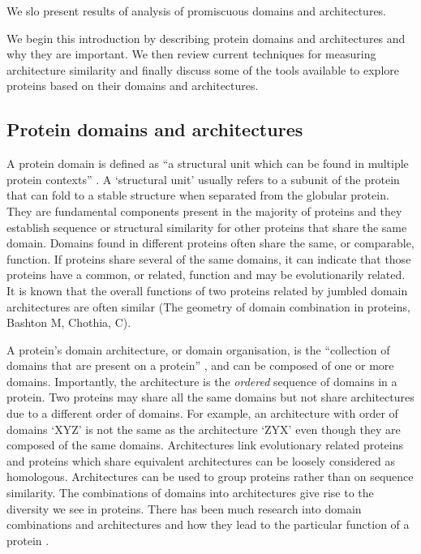 We slo present results of analysis of promiscuous domains and architectures.

We begin this introduction by describing protein domains and architectures and why they are important. We then review current techniques for measuring architecture similarity and finally discuss some of the tools available to explore proteins based on their domains and architectures.



\subsection{Protein domains and architectures}
A protein domain is defined as ``a structural unit which can be found in multiple protein contexts'' \cite{pfamdb}. A `structural unit' usually refers to a subunit of the protein that can fold to a stable structure when separated from the globular protein. They are fundamental components present in the majority of proteins and they establish sequence or structural similarity for other proteins that share the same domain. Domains found in different proteins often share the same, or comparable, function. If proteins share several of the same domains, it can indicate that those proteins have a common, or related, function and may be evolutionarily related. It is known that the overall functions of two proteins related by jumbled domain architectures are often similar (The geometry of domain combination in proteins, Bashton M, Chothia, C).

A protein's domain architecture, or domain organisation, is the ``collection of domains that are present on a protein'' \cite{pfamdb}, and can be composed of one or more domains. Importantly, the architecture is the \textit{ordered} sequence of domains in a protein. Two proteins may share all the same domains but not share architectures due to a different order of domains. For example, an architecture with order of domains `XYZ' is not the same as the architecture `ZYX' even though they are composed of the same domains. Architectures link evolutionary related proteins \cite{fong} and proteins which share equivalent architectures can be loosely considered as homologous\cite{The geometry of domain combination in proteins, Bashton M, Chothia, C}. Architectures can be used to group proteins rather than on sequence similarity. The combinations of domains into architectures give rise to the diversity we see in proteins. There has been much research into domain combinations and architectures and how they  lead to the particular function of a protein \cite{15 - citation 16,17 pg2}.   

